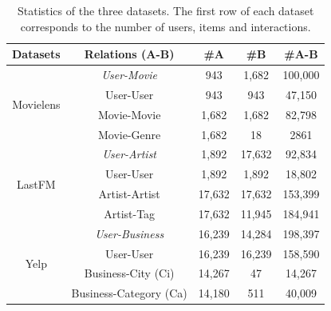 \begin{table}[t]%
\centering
\begin{small}
\caption{\label{tab_Data} Statistics of the three datasets. The first row of each dataset corresponds to the number of users, items and interactions.}%
{
\begin{tabular}{|c||c|c|c|c|}
\hline
Datasets & {Relations (A-B)} & {\#A} & {\#B} & {\#A-B} \\%
\hline
\hline
\multirow{4}{*}{Movielens} & {\emph{User-Movie}} & {943} & {1,682} & {100,000}\\%
\cline{2-5}
\multirow{4}{*}{} &  {User-User} & {943} & {943} & {47,150} \\%
\cline{2-5}
\multirow{4}{*}{} &{Movie-Movie} & {1,682} & {1,682} & {82,798} \\%
\cline{2-5}
\multirow{4}{*}{} & {Movie-Genre} & {1,682} & {18} & {2861} \\%
\hline
\hline
\multirow{4}{*}{LastFM} & {\emph{User-Artist}} & {1,892} & {17,632} & {92,834}\\%
\cline{2-5}
\multirow{4}{*}{} & {User-User} & {1,892} & {1,892} & {18,802} \\%
\cline{2-5}
\multirow{4}{*}{} & {Artist-Artist} & {17,632} & {17,632} & {153,399} \\%
\cline{2-5}
\multirow{4}{*}{} & {Artist-Tag} & {17,632} & {11,945} & {184,941} \\%
\hline
\hline
\multirow{4}{*}{Yelp} & {\emph{User-Business}} & {16,239} & {14,284} & {198,397} \\%
\cline{2-5}
\multirow{4}{*}{} & {User-User} & {16,239} & {16,239} & {158,590}\\%
\cline{2-5}
\multirow{4}{*}{} & {Business-City (Ci)} & {14,267} & {47} & {14,267} \\%
\cline{2-5}
\multirow{4}{*}{} & {Business-Category (Ca)} & {14,180} & {511} & {40,009} \\%
\hline
\end{tabular}}
\end{small}
\end{table}

